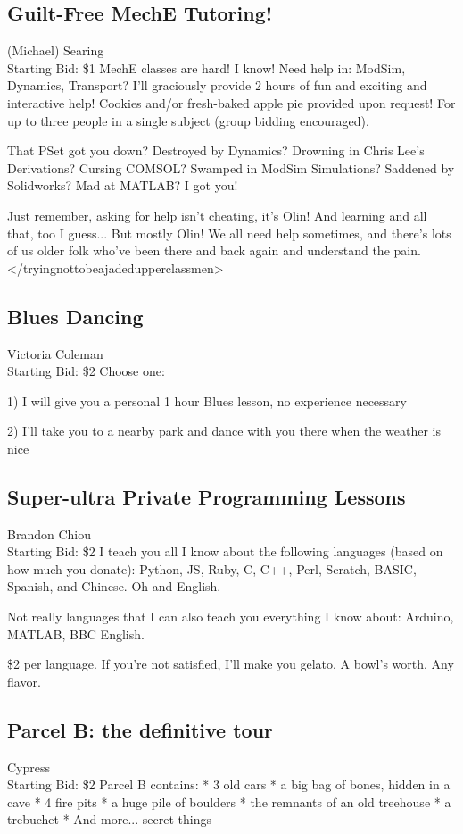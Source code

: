 \documentclass[11pt]{article}
\begin{document}
\subsection{Guilt-Free MechE Tutoring!}
(Michael) Searing
\\
Starting Bid: \$1
\newline
MechE classes are hard!  I know!  Need help in: ModSim, Dynamics, Transport?  I'll graciously provide 2 hours of fun and exciting and interactive help!  Cookies and/or fresh-baked apple pie provided upon request!  For up to three people in a single subject (group bidding encouraged).

That PSet got you down?  Destroyed by Dynamics?  Drowning in Chris Lee's Derivations?  Cursing COMSOL?  Swamped in ModSim Simulations?  Saddened by Solidworks?  Mad at MATLAB?  I got you!

Just remember, asking for help isn't cheating, it's Olin!  And learning and all that, too I guess... But mostly Olin!  We all need help sometimes, and there's lots of us older folk who've been there and back again and understand the pain. </tryingnottobeajadedupperclassmen>
\subsection{Blues Dancing}
Victoria Coleman
\\
Starting Bid: \$2
\newline
Choose one:

1) I will give you a personal 1 hour Blues lesson, no experience necessary

2) I'll take you to a nearby park and dance with you there when the weather is nice
\subsection{Super-ultra Private Programming Lessons}
Brandon Chiou
\\
Starting Bid: \$2
\newline
I teach you all I know about the following languages (based on how much you donate): Python, JS, Ruby, C, C++, Perl, Scratch, BASIC, Spanish, and Chinese. Oh and English.

Not really languages that I can also teach you everything I know about: Arduino, MATLAB, BBC English.

\$2 per language. If you're not satisfied, I'll make you gelato. A bowl's worth. Any flavor.
\subsection{Parcel B: the definitive tour}
Cypress
\\
Starting Bid: \$2
\newline
Parcel B contains:
* 3 old cars
* a big bag of bones, hidden in a cave
* 4 fire pits
* a huge pile of boulders
* the remnants of an old treehouse
* a trebuchet
* And more... secret things
\end{document}
